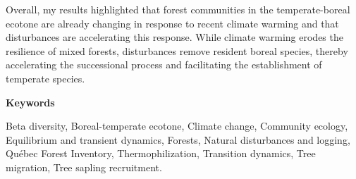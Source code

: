 Overall, my results highlighted that forest communities in the
temperate-boreal ecotone are already changing in response to recent
climate warming and that disturbances are accelerating this response.
While climate warming erodes the resilience of mixed forests,
disturbances remove resident boreal species, thereby accelerating the
successional process and facilitating the establishment of temperate
species.

\vspace{1cm}

\textbf{Keywords}

Beta diversity, Boreal-temperate ecotone, Climate change, Community
ecology, Equilibrium and transient dynamics, Forests, Natural
disturbances and logging, Québec Forest Inventory, Thermophilization,
Transition dynamics, Tree migration, Tree sapling recruitment.
